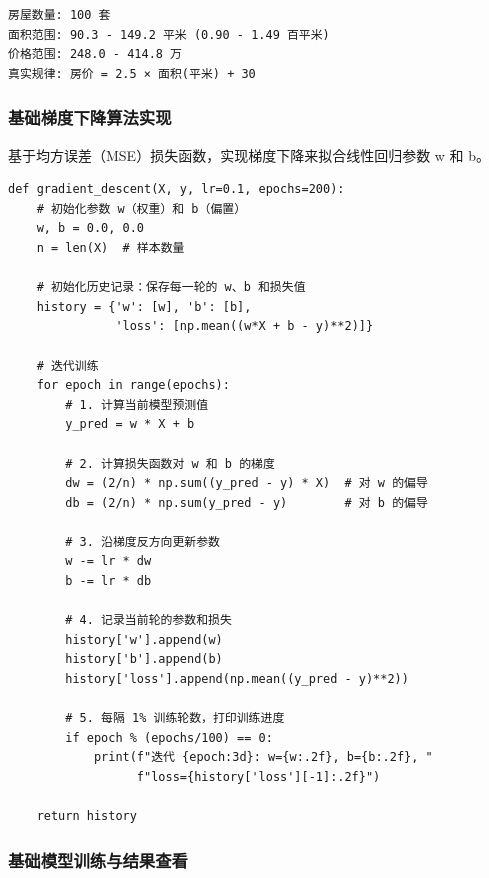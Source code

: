 \documentclass[10pt]{article}
\numberwithin{equation}{section}
\theoremstyle{plain}
\theoremstyle{definition}
\theoremstyle{remark}
\begin{document}
\begin{RemarkBox}[运行结果]
	\begin{verbatim}
房屋数量: 100 套
面积范围: 90.3 - 149.2 平米 (0.90 - 1.49 百平米)
价格范围: 248.0 - 414.8 万
真实规律: 房价 = 2.5 × 面积(平米) + 30
\end{verbatim}
\end{RemarkBox}

\subsubsection{基础梯度下降算法实现}

基于均方误差（MSE）损失函数，实现梯度下降来拟合线性回归参数 w 和 b。

\begin{CodeBox}
	\begin{lstlisting}[style=PythonStyle]
def gradient_descent(X, y, lr=0.1, epochs=200):
    # 初始化参数 w（权重）和 b（偏置）
    w, b = 0.0, 0.0
    n = len(X)  # 样本数量
    
    # 初始化历史记录：保存每一轮的 w、b 和损失值
    history = {'w': [w], 'b': [b], 
               'loss': [np.mean((w*X + b - y)**2)]}
    
    # 迭代训练
    for epoch in range(epochs):
        # 1. 计算当前模型预测值
        y_pred = w * X + b
        
        # 2. 计算损失函数对 w 和 b 的梯度
        dw = (2/n) * np.sum((y_pred - y) * X)  # 对 w 的偏导
        db = (2/n) * np.sum(y_pred - y)        # 对 b 的偏导
        
        # 3. 沿梯度反方向更新参数
        w -= lr * dw
        b -= lr * db
        
        # 4. 记录当前轮的参数和损失
        history['w'].append(w)
        history['b'].append(b)
        history['loss'].append(np.mean((y_pred - y)**2))
        
        # 5. 每隔 1% 训练轮数，打印训练进度
        if epoch % (epochs/100) == 0:
            print(f"迭代 {epoch:3d}: w={w:.2f}, b={b:.2f}, "
                  f"loss={history['loss'][-1]:.2f}")
    
    return history
\end{lstlisting}
\end{CodeBox}

\subsubsection{基础模型训练与结果查看}
\end{document}
